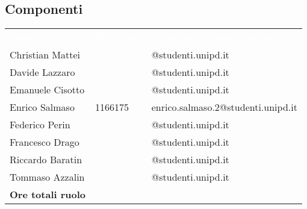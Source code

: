 \subsection{Componenti}
{
	\renewcommand{\arraystretch}{2}
	\centering
	\begin{longtable}{ C{5cm} C{4cm} C{5cm} }
		\textcolor{white}{\textbf{Nome}} & \textcolor{white}{\textbf{Matricola}} & \textcolor{white}{\textbf{Indirizzo di posta elettronica}}\\	
		
		
		Christian Mattei & & @studenti.unipd.it \\
		Davide Lazzaro & & @studenti.unipd.it\\
		Emanuele Cisotto & & @studenti.unipd.it\\
		Enrico Salmaso & 1166175 & enrico.salmaso.2@studenti.unipd.it \\
		Federico Perin & & @studenti.unipd.it \\
		Francesco Drago & & @studenti.unipd.it \\
		Riccardo Baratin & & @studenti.unipd.it \\
		Tommaso Azzalin & & @studenti.unipd.it \\
		\textbf{Ore totali ruolo} & &  \\
		
		
	\end{longtable}
}